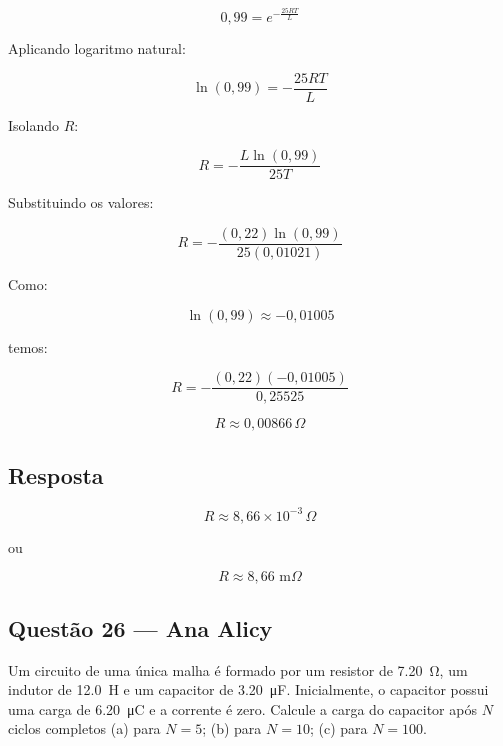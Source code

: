 \documentclass[12pt,a4paper]{article}
\begin{document}
\[
0{,}99=e^{-\frac{25RT}{L}}
\]

Aplicando logaritmo natural:

\[
\ln(0{,}99)=-\frac{25RT}{L}
\]

Isolando $R$:

\[
R=-\frac{L\ln(0{,}99)}{25T}
\]

Substituindo os valores:

\[
R=-\frac{(0{,}22)\ln(0{,}99)}{25(0{,}01021)}
\]

Como:

\[
\ln(0{,}99)\approx -0{,}01005
\]

temos:

\[
R=-\frac{(0{,}22)(-0{,}01005)}{0{,}25525}
\]

\[
R\approx 0{,}00866\,\Omega
\]

\subsection*{Resposta}

\[
\boxed{R \approx 8{,}66\times10^{-3}\,\Omega}
\]

ou

\[
\boxed{R \approx 8{,}66\text{ m}\Omega}
\]


\subsection{Questão 26 — Ana Alicy}

Um circuito de uma única malha é formado por um resistor de \SI{7,20}{\ohm}, um indutor de \SI{12,0}{\henry} e um capacitor de \SI{3,20}{\micro\farad}. Inicialmente, o capacitor possui uma carga de \SI{6,20}{\micro\coulomb} e a corrente é zero. Calcule a carga do capacitor após $N$ ciclos completos (a) para $N = 5$; (b) para $N = 10$; (c) para $N = 100$.
\vspace{0.8cm}
\end{document}
